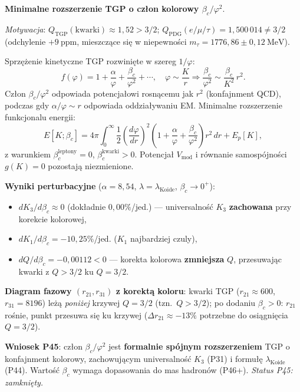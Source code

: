 \begin{problem}
\begin{description}[leftmargin=2em, labelindent=0pt]
\item[OK-7 --- \textbf{Oddzialywania kolorowe (P45)}:]
  \textbf{Minimalne rozszerzenie TGP o cz\l{}on kolorowy $\beta_c/\varphi^2$}.
  \par
  \textit{Motywacja}: $Q_\text{TGP}(\text{kwarki}) \approx 1{,}52 > 3/2$;
  $Q_\text{PDG}(e/\mu/\tau) = 1{,}500\,014 \neq 3/2$ (odchylenie $+9\ \text{ppm}$,
  mieszcz\k{a}ce si\k{e} w niepewno\'sci $m_\tau = 1776{,}86 \pm 0{,}12\ \text{MeV}$).
  \par
  Sprz\k{e}\.zenie kinetyczne TGP rozwini\k{e}te w szereg $1/\varphi$:
  \begin{equation}
    f(\varphi) = 1 + \frac{\alpha}{\varphi} + \frac{\beta_c}{\varphi^2} + \cdots,
    \quad \varphi \sim \frac{K}{r} \Longrightarrow
    \frac{\beta_c}{\varphi^2} \sim \frac{\beta_c}{K^2}\,r^2.
  \end{equation}
  Cz\l{}on $\beta_c/\varphi^2$ odpowiada potencja\l{}owi rosn\k{a}cemu jak $r^2$
  (konfajnment QCD), podczas gdy $\alpha/\varphi \sim r$ odpowiada oddzia\l{}ywaniu EM.
  Minimalne rozszerzenie funkcjonalu energii:
  \begin{equation}\label{eq:E-kolor}
    E[K;\beta_c] = 4\pi \int_0^\infty
      \frac{1}{2}\!\left(\frac{d\varphi}{dr}\right)^{\!2}
      \!\left(1 + \frac{\alpha}{\varphi} + \frac{\beta_c}{\varphi^2}\right) r^2\,dr
      + E_p[K],
  \end{equation}
  z warunkiem $\beta_c^{\text{leptony}} = 0$, $\beta_c^{\text{kwarki}} > 0$.
  Potencja\l{} $V_\text{mod}$ i r\'ownanie samosp\'ojno\'sci $g(K)=0$
  pozostaj\k{a} niezmienione.
  \par
  \textbf{Wyniki perturbacyjne} ($\alpha=8{,}54$, $\lambda=\lambda_\text{Koide}$,
  $\beta_c \to 0^+$):
  \begin{itemize}[nosep]
    \item $dK_3/d\beta_c \approx 0$ (dok\l{}adnie $0{,}00\%$/jed.)
          --- universalno\'s\'c $K_3$ \textbf{zachowana} przy korekcie kolorowej,
    \item $dK_1/d\beta_c = -10{,}25\%$/jed. ($K_1$ najbardziej czuly),
    \item $dQ/d\beta_c = -0{,}00112 < 0$
          --- korekta kolorowa \textbf{zmniejsza} $Q$,
          przesuwaj\k{a}c kwarki z $Q > 3/2$ ku $Q = 3/2$.
  \end{itemize}
  \par
  \textbf{Diagram fazowy $(r_{21}, r_{31})$ z korekt\k{a} koloru}:
  kwarki TGP ($r_{21} \approx 600$, $r_{31} = 8196$) le\.z\k{a}
  \emph{poni\.zej} krzywej $Q=3/2$ (tzn.\ $Q > 3/2$);
  po dodaniu $\beta_c > 0$: $r_{21}$ ro\'snie, punkt
  przesuwa si\k{e} ku krzywej ($\Delta r_{21} \approx -13\%$
  potrzebne do osi\k{a}gni\k{e}cia $Q=3/2$).
  \par
  \textbf{Wniosek P45}: cz\l{}on $\beta_c/\varphi^2$ jest \textbf{formalnie spójnym
  rozszerzeniem} TGP o konfajnment kolorowy, zachowuj\k{a}cym
  universalno\'s\'c $K_3$ (P31) i formu\l{}\k{e} $\lambda_\text{Koide}$ (P44).
  Warto\'s\'c $\beta_c$ wymaga dopasowania do mas hadron\'ow (P46+).
  \textit{Status P45: zamkni\k{e}ty.}


\end{description}
\end{problem}
